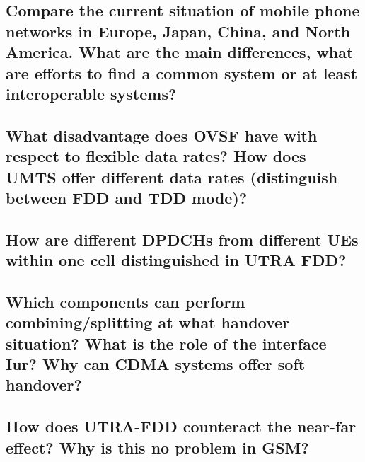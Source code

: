 \subsection{Compare the current situation of mobile phone networks in Europe, Japan, China, and North America. What are the main differences, what are efforts to find a common system or at least interoperable systems?}

\subsection{What disadvantage does OVSF have with respect to flexible data rates? How does UMTS offer different data rates (distinguish between FDD and TDD mode)?}

\subsection{How are different DPDCHs from different UEs within one cell distinguished in UTRA FDD?}

\subsection{Which components can perform combining/splitting at what handover situation? What is the role of the interface Iur? Why can CDMA systems offer soft handover?}

\subsection{How does UTRA-FDD counteract the near-far effect? Why is this no problem in GSM?}


